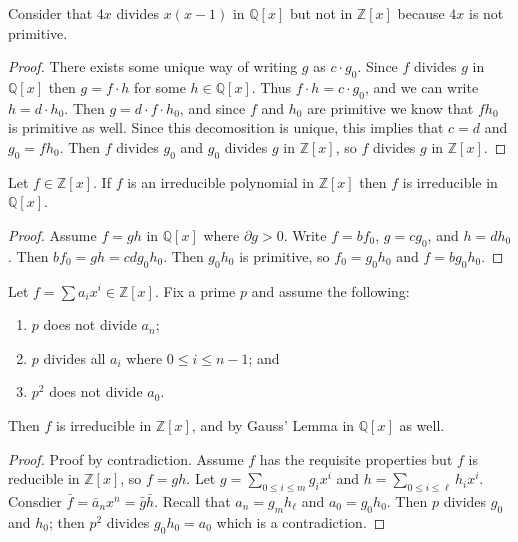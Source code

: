 \begin{example}
Consider that $4x$ divides $x(x-1)$ in $\mathbb{Q}[x]$ but not in $\mathbb{Z}[x]$ because $4x$ is not primitive.
\end{example}

\begin{proof}
There exists some unique way of writing $g$ as $c \cdot g_0$. Since $f$ divides $g$ in $\mathbb{Q}[x]$ then $g = f \cdot h$ for some $h \in \mathbb{Q}[x]$. Thus $f \cdot h = c \cdot g_0$, and we can write $h = d \cdot h_0$. Then $g = d \cdot f \cdot h_0$, and since $f$ and $h_0$ are primitive we know that $fh_0$ is primitive as well. Since this decomosition is unique, this implies that $c = d$ and $g_0 = f h_0$. Then $f$ divides $g_0$ and $g_0$ divides $g$ in $\mathbb{Z}[x]$, so $f$ divides $g$ in $\mathbb{Z}[x]$.
\end{proof}

\begin{lemma}[Gauss]
Let $f \in \mathbb{Z}[x]$. If $f$ is an irreducible polynomial in $\mathbb{Z}[x]$ then $f$ is irreducible in $\mathbb{Q}[x]$.
\end{lemma}

\begin{proof}
Assume $f = gh$ in $\mathbb{Q}[x]$ where $\partial g > 0$. Write $f = bf_0$, $g = cg_0$, and $h = dh_0$. Then $bf_0 = gh = cdg_0h_0$. Then $g_0h_0$ is primitive, so $f_0 = g_0h_0$ and $f = bg_0h_0$.
\end{proof}

\begin{lemma}
Let $f = \sum a_ix^i \in \mathbb{Z}[x]$. Fix a prime $p$ and assume the following:
\begin{enumerate}
\item $p$ does not divide $a_n$;
\item $p$ divides all $a_i$ where $0 \leq i \leq n-1$; and 
\item $p^2$ does not divide $a_0$.
\end{enumerate}
Then $f$ is irreducible in $\mathbb{Z}[x]$, and by Gauss' Lemma in $\mathbb{Q}[x]$ as well.
\end{lemma}

\begin{proof}
Proof by contradiction. Assume $f$ has the requisite properties but $f$ is reducible in $\mathbb{Z}[x]$, so $f = gh$. Let $g = \sum_{0 \leq i \leq m} g_ix^i$ and $h = \sum_{0 \leq i \leq \ell} h_ix^i$. Consdier $\bar{f} = \bar{a}_nx^n = \bar{g}\bar{h}$. Recall that $a_n = g_mh_\ell$ and $a_0 = g_0h_0$. Then $p$ divides $g_0$ and $h_0$; then $p^2$ divides $g_0h_0 = a_0$ which is a contradiction.
\end{proof}

